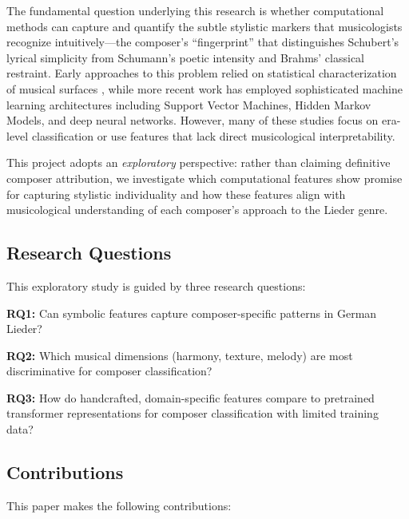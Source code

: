 \documentclass{article}
\begin{document}
The fundamental question underlying this research is whether computational methods can capture and quantify the subtle stylistic markers that musicologists recognize intuitively---the composer's ``fingerprint'' that distinguishes Schubert's lyrical simplicity from Schumann's poetic intensity and Brahms' classical restraint. Early approaches to this problem relied on statistical characterization of musical surfaces \cite{Youngblood1958}, while more recent work has employed sophisticated machine learning architectures including Support Vector Machines, Hidden Markov Models, and deep neural networks. However, many of these studies focus on era-level classification or use features that lack direct musicological interpretability.

This project adopts an \textit{exploratory} perspective: rather than claiming definitive composer attribution, we investigate which computational features show promise for capturing stylistic individuality and how these features align with musicological understanding of each composer's approach to the Lieder genre.

\subsection{Research Questions}

This exploratory study is guided by three research questions:

\textbf{RQ1:} Can symbolic features capture composer-specific patterns in German Lieder?

\textbf{RQ2:} Which musical dimensions (harmony, texture, melody) are most discriminative for composer classification?

\textbf{RQ3:} How do handcrafted, domain-specific features compare to pretrained transformer representations for composer classification with limited training data?

\subsection{Contributions}

This paper makes the following contributions:
\end{document}
